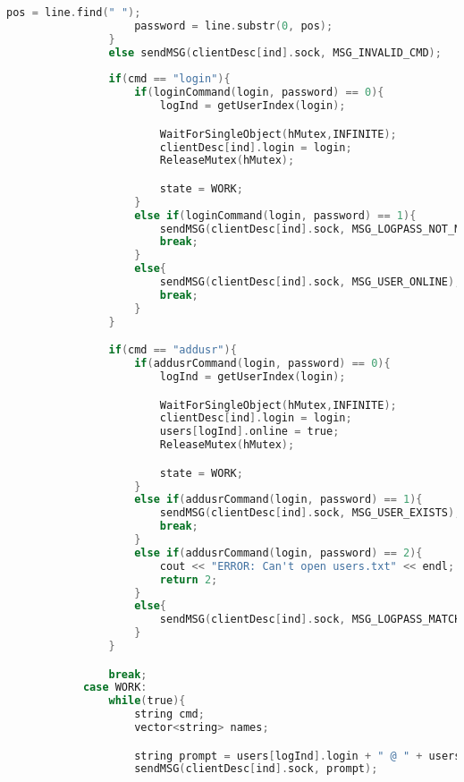 \begin{append}
\begin{lstlisting}[language=C, label=lst:createserver]
                    pos = line.find(" ");
                    password = line.substr(0, pos);
                }
                else sendMSG(clientDesc[ind].sock, MSG_INVALID_CMD);
                
                if(cmd == "login"){
                    if(loginCommand(login, password) == 0){
                        logInd = getUserIndex(login);

                        WaitForSingleObject(hMutex,INFINITE);
                        clientDesc[ind].login = login;
                        ReleaseMutex(hMutex);

                        state = WORK;
                    }
                    else if(loginCommand(login, password) == 1){
                        sendMSG(clientDesc[ind].sock, MSG_LOGPASS_NOT_MATCH);
                        break;
                    }
                    else{
                        sendMSG(clientDesc[ind].sock, MSG_USER_ONLINE);
                        break;                        
                    }
                }

                if(cmd == "addusr"){
                    if(addusrCommand(login, password) == 0){
                        logInd = getUserIndex(login);

                        WaitForSingleObject(hMutex,INFINITE);
                        clientDesc[ind].login = login;
                        users[logInd].online = true;
                        ReleaseMutex(hMutex);

                        state = WORK;
                    }
                    else if(addusrCommand(login, password) == 1){
                        sendMSG(clientDesc[ind].sock, MSG_USER_EXISTS);
                        break;
                    }
                    else if(addusrCommand(login, password) == 2){
                        cout << "ERROR: Can't open users.txt" << endl;
                        return 2;
                    }
                    else{
                        sendMSG(clientDesc[ind].sock, MSG_LOGPASS_MATCHING);
                    }
                }

                break;
            case WORK:
                while(true){
                    string cmd;
                    vector<string> names;

                    string prompt = users[logInd].login + " @ " + users[logInd].path + " $ \n";
                    sendMSG(clientDesc[ind].sock, prompt);
                    

\end{lstlisting}
\end{append}
